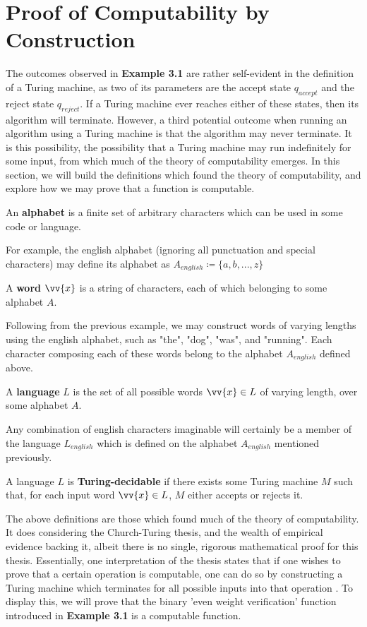 \documentclass{article}
\begin{document}
\section{Proof of Computability by Construction}
The outcomes observed in \textbf{Example 3.1} are rather self-evident in the definition of a Turing machine, as two of its parameters are the accept state $q_{accept}$ and the reject state $q_{reject}$.  If a Turing machine ever reaches either of these states, then its algorithm will terminate.  However, a third potential outcome when running an algorithm using a Turing machine is that the algorithm may never terminate.  It is this possibility, the possibility that a Turing machine may run indefinitely for some input, from which much of the theory of computability emerges.  In this section, we will build the definitions which found the theory of computability, and explore how we may prove that a function is computable.
\begin{defin}
	An \textbf{alphabet} is a finite set of arbitrary characters which can be used in some code or language.
\end{defin}
\noindent For example, the english alphabet (ignoring all punctuation and special characters) may define its alphabet as $A_{english} \coloneq \{ a, b, ... , z \}$
\begin{defin}
	A \textbf{word} $\vv{x}$ is a string of characters, each of which belonging to some alphabet $A$.
\end{defin}
\noindent Following from the previous example, we may construct words of varying lengths using the english alphabet, such as "the", "dog", "was", and "running".  Each character composing each of these words belong to the alphabet $A_{english}$ defined above.
\begin{defin}
	A \textbf{language} $L$ is the set of all possible words $\vv{x} \in L$ of varying length, over some alphabet $A$.
\end{defin}
\noindent Any combination of english characters imaginable will certainly be a member of the language $L_{english}$ which is defined on the alphabet $A_{english}$ mentioned previously.
\begin{defin}
	A language $L$ is \textbf{Turing-decidable} if there exists some Turing machine $M$ such that, for each input word $\vv{x} \in L$, $M$ either accepts or rejects it. \cite{2}
\end{defin}
\noindent The above definitions are those which found much of the theory of computability.  It does considering the Church-Turing thesis, and the wealth of empirical evidence backing it, albeit there is no single, rigorous mathematical proof for this thesis.  Essentially, one interpretation of the thesis states that if one wishes to prove that a certain operation is computable, one can do so by constructing a Turing machine which terminates for all possible inputs into that operation \cite{4}.  To display this, we will prove that the binary 'even weight verification' function introduced in \textbf{Example 3.1} is a computable function.
\end{document}
